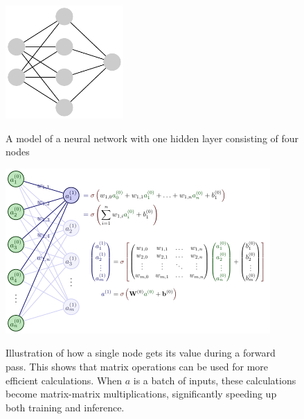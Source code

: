 \documentclass[twoside,11pt]{report}
\begin{document}
    \begin{figure}[h]
        \begin{center}
            \includegraphics[width=0.4\textwidth]{tikzfigures/nn.pdf}
        \end{center}
        \caption{A model of a neural network with one hidden layer consisting of four nodes}\label{fig:nn}
        \cite{neutelings_tikzcode}
    \end{figure}

    \begin{figure}[h]
        \begin{center}
            \includegraphics[width=0.9\textwidth]{tikzfigures/nnActivation.pdf}
        \end{center}
        \caption{Illustration of how a single node gets its value during a forward pass. This shows that matrix 
        operations can be used for more efficient calculations. When $a$ is a batch of inputs, these calculations 
    become matrix-matrix multiplications, significantly speeding up both training and inference.}\label{fig:nn_math}   
        \cite{neutelings_tikzcode}
    \end{figure}
\end{document}
